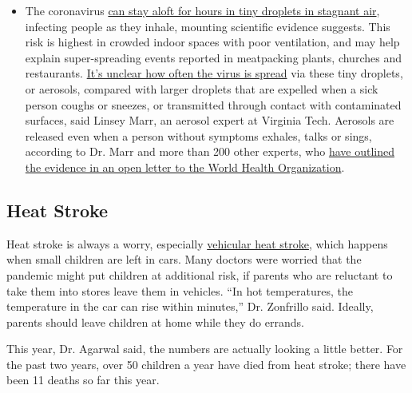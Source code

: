 \begin{itemize}
  \begin{itemize}
  \tightlist
  \item
    The coronavirus
    \href{https://www.nytimes.com/2020/07/04/health/239-experts-with-one-big-claim-the-coronavirus-is-airborne.html?action=click\&pgtype=Article\&state=default\&region=MAIN_CONTENT_3\&context=storylines_faq}{can
    stay aloft for hours in tiny droplets in stagnant air}, infecting
    people as they inhale, mounting scientific evidence suggests. This
    risk is highest in crowded indoor spaces with poor ventilation, and
    may help explain super-spreading events reported in meatpacking
    plants, churches and restaurants.
    \href{https://www.nytimes.com/2020/07/06/health/coronavirus-airborne-aerosols.html?action=click\&pgtype=Article\&state=default\&region=MAIN_CONTENT_3\&context=storylines_faq}{It's
    unclear how often the virus is spread} via these tiny droplets, or
    aerosols, compared with larger droplets that are expelled when a
    sick person coughs or sneezes, or transmitted through contact with
    contaminated surfaces, said Linsey Marr, an aerosol expert at
    Virginia Tech. Aerosols are released even when a person without
    symptoms exhales, talks or sings, according to Dr. Marr and more
    than 200 other experts, who
    \href{https://academic.oup.com/cid/article/doi/10.1093/cid/ciaa939/5867798}{have
    outlined the evidence in an open letter to the World Health
    Organization}.
  \end{itemize}
\end{itemize}

\hypertarget{heat-stroke}{%
\subsection{Heat Stroke}\label{heat-stroke}}

Heat stroke is always a worry, especially
\href{https://www.kidsandcars.org/how-kids-get-hurt/heat-stroke/}{vehicular
heat stroke}, which happens when small children are left in cars. Many
doctors were worried that the pandemic might put children at additional
risk, if parents who are reluctant to take them into stores leave them
in vehicles. ``In hot temperatures, the temperature in the car can rise
within minutes,'' Dr. Zonfrillo said. Ideally, parents should leave
children at home while they do errands.

This year, Dr. Agarwal said, the numbers are actually looking a little
better. For the past two years, over 50 children a year have died from
heat stroke; there have been 11 deaths so far this year.

